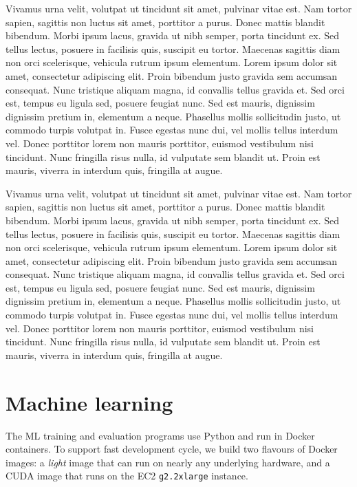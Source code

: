 \documentclass[a4paper, 10 pt, conference]{IEEEtran}
\begin{document}
Vivamus urna velit, volutpat ut tincidunt sit amet, pulvinar vitae est. Nam tortor sapien, sagittis non luctus sit amet, porttitor a purus. Donec mattis blandit bibendum. Morbi ipsum lacus, gravida ut nibh semper, porta tincidunt ex. Sed tellus lectus, posuere in facilisis quis, suscipit eu tortor. Maecenas sagittis diam non orci scelerisque, vehicula rutrum ipsum elementum. Lorem ipsum dolor sit amet, consectetur adipiscing elit. Proin bibendum justo gravida sem accumsan consequat. Nunc tristique aliquam magna, id convallis tellus gravida et. Sed orci est, tempus eu ligula sed, posuere feugiat nunc. Sed est mauris, dignissim dignissim pretium in, elementum a neque. Phasellus mollis sollicitudin justo, ut commodo turpis volutpat in. Fusce egestas nunc dui, vel mollis tellus interdum vel. Donec porttitor lorem non mauris porttitor, euismod vestibulum nisi tincidunt. Nunc fringilla risus nulla, id vulputate sem blandit ut. Proin est mauris, viverra in interdum quis, fringilla at augue.

Vivamus urna velit, volutpat ut tincidunt sit amet, pulvinar vitae est. Nam tortor sapien, sagittis non luctus sit amet, porttitor a purus. Donec mattis blandit bibendum. Morbi ipsum lacus, gravida ut nibh semper, porta tincidunt ex. Sed tellus lectus, posuere in facilisis quis, suscipit eu tortor. Maecenas sagittis diam non orci scelerisque, vehicula rutrum ipsum elementum. Lorem ipsum dolor sit amet, consectetur adipiscing elit. Proin bibendum justo gravida sem accumsan consequat. Nunc tristique aliquam magna, id convallis tellus gravida et. Sed orci est, tempus eu ligula sed, posuere feugiat nunc. Sed est mauris, dignissim dignissim pretium in, elementum a neque. Phasellus mollis sollicitudin justo, ut commodo turpis volutpat in. Fusce egestas nunc dui, vel mollis tellus interdum vel. Donec porttitor lorem non mauris porttitor, euismod vestibulum nisi tincidunt. Nunc fringilla risus nulla, id vulputate sem blandit ut. Proin est mauris, viverra in interdum quis, fringilla at augue.


\section{Machine learning}

The ML training and evaluation programs use Python and run in Docker containers. To support fast development cycle, we build two flavours of Docker images: a \emph{light} image that can run on nearly any underlying hardware, and a CUDA \cite{cuda} image that runs on the EC2 \texttt{g2.2xlarge} instance.
\end{document}
